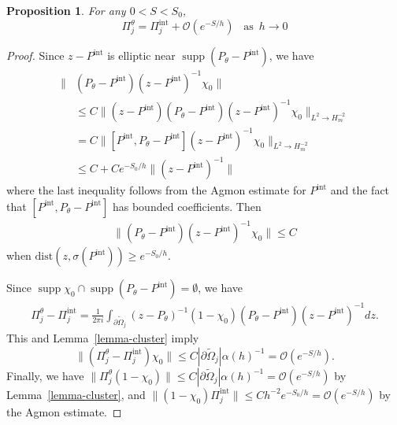 \documentclass[10pt,a4paper]{amsart}
\newtheorem{prop}{Proposition}
\newcommand{\supp}{\mathop{\mathrm{supp}}}
\begin{document}
\begin{prop}\label{prop-projection}
For any $0<S<S_0$, 
\[ 
\Pi_j^{\theta}= \Pi_j^{\mathrm{int}}+\mathcal{O}(e^{-S/h})\,\,\,\,\,\mathrm{as} \,\,\,h\to 0
\]

\end{prop}

\begin{proof}
Since $z-P^{\mathrm{int}}$ is elliptic near $\supp (P_{\theta}-P^{\mathrm{int}})$, we have 
\begin{align*}
\|&(P_{\theta}-P^{\mathrm{int}})(z-P^{\mathrm{int}})^{-1}\chi_0\|\\
&\le C\|(z-P^{\mathrm{int}})(P_{\theta}-P^{\mathrm{int}})(z-P^{\mathrm{int}})^{-1}\chi_0\|_{L^2\to H_m^{-2}} \\
&= C \|[P^{\mathrm{int}}, P_{\theta}-P^{\mathrm{int}}](z-P^{\mathrm{int}})^{-1}\chi_0\|_{L^2\to H_m^{-2}} \\
&\le C+C e^{-S_0/h}\|(z-P^{\mathrm{int}})^{-1}\|
\end{align*}
where the last inequality follows from the Agmon estimate for $P^{\mathrm{int}}$ 
and the fact that $[P^{\mathrm{int}}, P_{\theta}-P^{\mathrm{int}}]$ has bounded coefficients. 
Then 
\begin{align*}
\|(P_{\theta}-P^{\mathrm{int}})(z-P^{\mathrm{int}})^{-1}\chi_0\|\le C
\end{align*}
when $\mathrm{dist}(z, \sigma(P^{\mathrm{int}}))\ge e^{-S_0/h}$. 

Since $\supp \chi_0\cap \supp (P_{\theta}-P^{\mathrm{int}})=\emptyset$, we have
\begin{align*}
 \Pi_j^{\theta}-\Pi_j^{\mathrm{int}}
=\frac{1}{2\pi i}\int_{\partial \widetilde{\Omega}_j}
(z-P_{\theta})^{-1}(1-\chi_0)(P_{\theta}-P^{\mathrm{int}})(z-P^{\mathrm{int}})^{-1}dz. 
\end{align*}
This and Lemma~\ref{lemma-cluster} imply 
\[
\| \left(\Pi_j^{\theta}- \Pi_j^{\mathrm{int}}\right) \chi_0\|\le C|\partial \widetilde{\Omega}_j| \alpha(h)^{-1} 
=\mathcal{O}(e^{-S/h}).
\] 
Finally, we have $\|\Pi_j^{\theta}(1-\chi_0)\|\le C|\partial \widetilde{\Omega}_j| \alpha(h)^{-1} 
=\mathcal{O}(e^{-S/h})$ by Lemma~\ref{lemma-cluster}, 
and $\|(1-\chi_0)\Pi_j^{\mathrm{int}}\|\le Ch^{-2}e^{-S_0/h}
=\mathcal{O}(e^{-S/h})$ by the Agmon estimate.
\end{proof}
\end{document}
